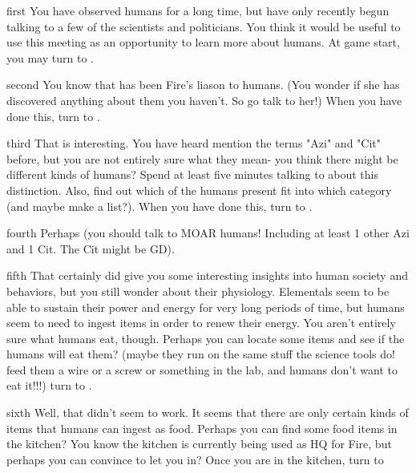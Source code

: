 \documentclass[notebook]{elementals} %
\begin{document}
\startnotebook{\nLearnAboutHumans{}}

\begin{page}{first}
You have observed humans for a long time, but have only recently begun talking to a few of the scientists and politicians.  You think it would be useful to use this meeting as an opportunity to learn more about humans.  At game start, you may  turn to .
\end{page}

\begin{page}{second}
You know that \cJuliet{} has been Fire's liason to humans.  (You wonder if she has discovered anything about them you haven't.  So go talk to her!) When you have done this, turn to .
\end {page}

\begin{page}{third}
 That is interesting.  You have heard \cDiplomat{} mention the terms "Azi" and "Cit" before, but you are not entirely sure what they mean- you think there might be different kinds of humans?  Spend at least five minutes talking to \cDiplomat{} about this distinction. Also, find out which of the humans present fit into which category (and maybe make a list?).  When you have done this, turn to .
\end{page}

\begin{page}{fourth}
Perhaps (you should talk to MOAR humans!  Including at least 1 other Azi and 1 Cit.  The Cit might be GD).
\end{page}

\begin{page}{fifth}
 That certainly did give you some interesting insights into human society and behaviors, but you still wonder about their physiology.  Elementals seem to be able to sustain their power and energy for very long periods of time, but humans seem to need to ingest items in order to renew their energy.  You aren't entirely sure what humans eat, though.  Perhaps you can locate some items and see if the humans will eat them?  (maybe they run on the same stuff the science tools do!  feed them a wire or a screw or something in the lab, and humans don't want to eat it!!!) 
 turn to .
\end{page}


\begin{page}{sixth}
 Well, that didn't seem to work.  It seems that there are only certain kinds of items that humans can ingest as food.  Perhaps you can find some food items in the kitchen?  You know the kitchen is currently being used as HQ for Fire, but perhaps you can convince \cJuliet {} to let you in?  Once you are in the kitchen, turn to 
\end{page}
\end{document}

